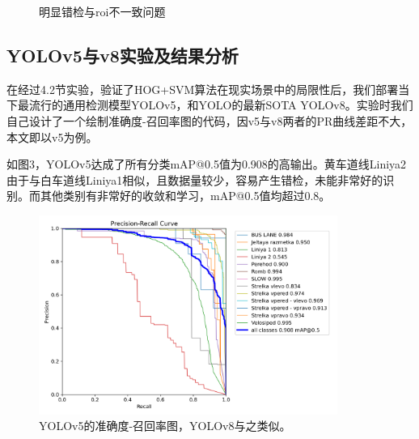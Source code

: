 \documentclass{article}
\begin{document}
\begin{figure}[H]
\begin{minipage}[t]{0.49\linewidth}
        \caption{明显错检与roi不一致问题}
        \label{fig:2}
    \end{minipage}
 \end{figure}

\subsection{YOLOv5与v8实验及结果分析}

在经过4.2节实验，验证了HOG+SVM算法在现实场景中的局限性后，我们部署当下最流行的通用检测模型YOLOv5，和YOLO的最新SOTA YOLOv8。实验时我们自己设计了一个绘制准确度-召回率图的代码，因v5与v8两者的PR曲线差距不大，本文即以v5为例。

如图3，YOLOv5达成了所有分类mAP@0.5值为0.908的高输出。黄车道线Liniya2由于与白车道线Liniya1相似，且数据量较少，容易产生错检，未能非常好的识别。而其他类别有非常好的收敛和学习，mAP@0.5值均超过0.8。
\begin{figure}[H]
    \centering
    \includegraphics[width=0.87\textwidth]{YOLOv5/train_yolov5/PR_curve.png}
    \caption{YOLOv5的准确度-召回率图，YOLOv8与之类似。}
    \label{fig:3}
\end{figure}
\end{document}
